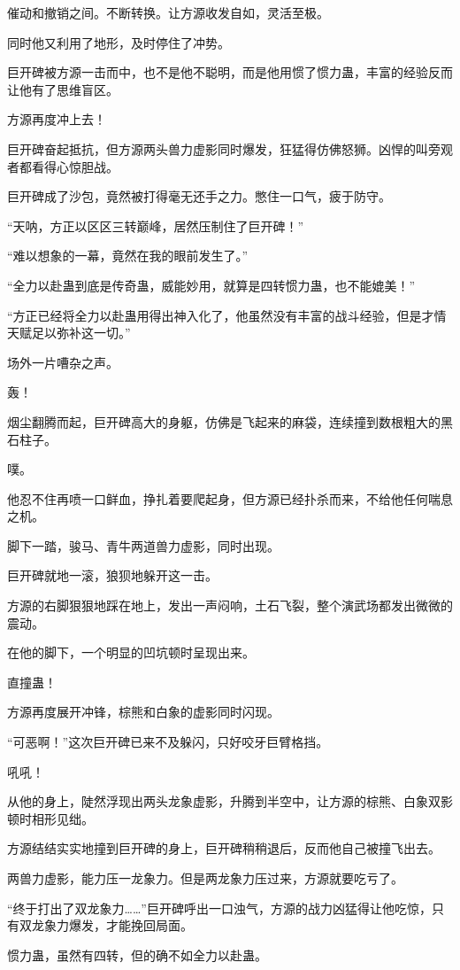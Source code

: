 \begin{this_body}
催动和撤销之间。不断转换。让方源收发自如，灵活至极。

同时他又利用了地形，及时停住了冲势。

巨开碑被方源一击而中，也不是他不聪明，而是他用惯了惯力蛊，丰富的经验反而让他有了思维盲区。

方源再度冲上去！

巨开碑奋起抵抗，但方源两头兽力虚影同时爆发，狂猛得仿佛怒狮。凶悍的叫旁观者都看得心惊胆战。

巨开碑成了沙包，竟然被打得毫无还手之力。憋住一口气，疲于防守。

“天呐，方正以区区三转巅峰，居然压制住了巨开碑！”

“难以想象的一幕，竟然在我的眼前发生了。”

“全力以赴蛊到底是传奇蛊，威能妙用，就算是四转惯力蛊，也不能媲美！”

“方正已经将全力以赴蛊用得出神入化了，他虽然没有丰富的战斗经验，但是才情天赋足以弥补这一切。”

场外一片嘈杂之声。

轰！

烟尘翻腾而起，巨开碑高大的身躯，仿佛是飞起来的麻袋，连续撞到数根粗大的黑石柱子。

噗。

他忍不住再喷一口鲜血，挣扎着要爬起身，但方源已经扑杀而来，不给他任何喘息之机。

脚下一踏，骏马、青牛两道兽力虚影，同时出现。

巨开碑就地一滚，狼狈地躲开这一击。

方源的右脚狠狠地踩在地上，发出一声闷响，土石飞裂，整个演武场都发出微微的震动。

在他的脚下，一个明显的凹坑顿时呈现出来。

直撞蛊！

方源再度展开冲锋，棕熊和白象的虚影同时闪现。

“可恶啊！”这次巨开碑已来不及躲闪，只好咬牙巨臂格挡。

吼吼！

从他的身上，陡然浮现出两头龙象虚影，升腾到半空中，让方源的棕熊、白象双影顿时相形见绌。

方源结结实实地撞到巨开碑的身上，巨开碑稍稍退后，反而他自己被撞飞出去。

两兽力虚影，能力压一龙象力。但是两龙象力压过来，方源就要吃亏了。

“终于打出了双龙象力……”巨开碑呼出一口浊气，方源的战力凶猛得让他吃惊，只有双龙象力爆发，才能挽回局面。

惯力蛊，虽然有四转，但的确不如全力以赴蛊。


\end{this_body}
